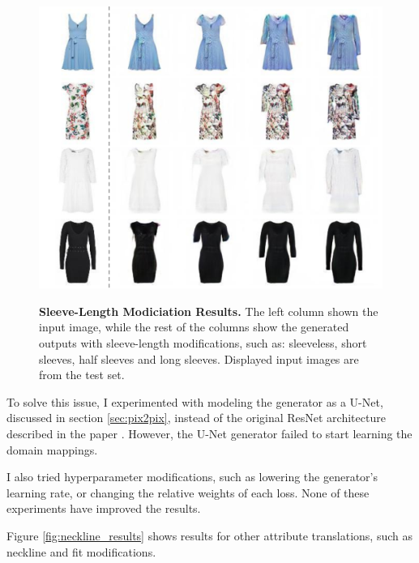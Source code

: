 \documentclass[12pt]{report}
\begin{document}
\begin{figure}[h]
\centering
{\includegraphics[width=.7\linewidth]{04_experiments/stargan/sleeve_results}}
\caption{\label{fig:sleeves_results} \textbf{Sleeve-Length Modiciation Results.} The left column shown the input image, while the rest of the columns show the generated outputs with sleeve-length modifications, such as: sleeveless, short sleeves, half sleeves and long sleeves. Displayed input images are from the test set.}
\end{figure}

To solve this issue, I experimented with modeling the generator as a U-Net, discussed in section \ref{sec:pix2pix}, instead of the original ResNet architecture described in the paper \cite{choi_stargan_2017}. However, the U-Net generator failed to start learning the domain mappings.

I also tried hyperparameter modifications, such as lowering the generator's learning rate, or changing the relative weights of each loss. None of these experiments have improved the results.

Figure \ref{fig:neckline_results} shows results for other attribute translations, such as neckline and fit modifications.
\end{document}
